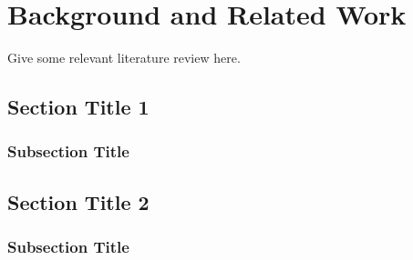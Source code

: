 \chapter{Background and Related Work}\label{chap:survey} 
Give some relevant literature review here. 
\section{Section Title 1}
\subsection{Subsection Title}
\section{Section Title 2}
\subsection{Subsection Title}




 



